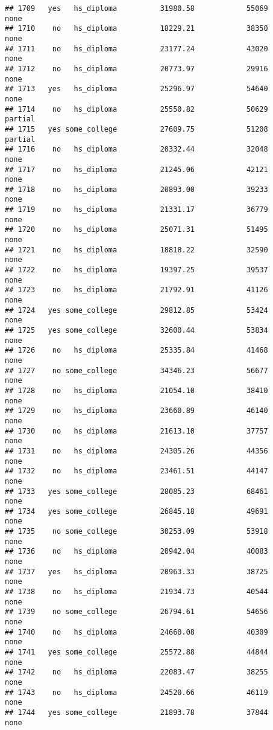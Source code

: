 \documentclass[
]{article}
\begin{document}
\begin{verbatim}
## 1709   yes   hs_diploma          31980.58            55069        none
## 1710    no   hs_diploma          18229.21            38350        none
## 1711    no   hs_diploma          23177.24            43020        none
## 1712    no   hs_diploma          20773.97            29916        none
## 1713   yes   hs_diploma          25296.97            54640        none
## 1714    no   hs_diploma          25550.82            50629     partial
## 1715   yes some_college          27609.75            51208     partial
## 1716    no   hs_diploma          20332.44            32048        none
## 1717    no   hs_diploma          21245.06            42121        none
## 1718    no   hs_diploma          20893.00            39233        none
## 1719    no   hs_diploma          21331.17            36779        none
## 1720    no   hs_diploma          25071.31            51495        none
## 1721    no   hs_diploma          18818.22            32590        none
## 1722    no   hs_diploma          19397.25            39537        none
## 1723    no   hs_diploma          21792.91            41126        none
## 1724   yes some_college          29812.85            53424        none
## 1725   yes some_college          32600.44            53834        none
## 1726    no   hs_diploma          25335.84            41468        none
## 1727    no some_college          34346.23            56677        none
## 1728    no   hs_diploma          21054.10            38410        none
## 1729    no   hs_diploma          23660.89            46140        none
## 1730    no   hs_diploma          21613.10            37757        none
## 1731    no   hs_diploma          24305.26            44356        none
## 1732    no   hs_diploma          23461.51            44147        none
## 1733   yes some_college          28085.23            68461        none
## 1734   yes some_college          26845.18            49691        none
## 1735    no some_college          30253.09            53918        none
## 1736    no   hs_diploma          20942.04            40083        none
## 1737   yes   hs_diploma          20963.33            38725        none
## 1738    no   hs_diploma          21934.73            40544        none
## 1739    no some_college          26794.61            54656        none
## 1740    no   hs_diploma          24660.08            40309        none
## 1741   yes some_college          25572.88            44844        none
## 1742    no   hs_diploma          22083.47            38255        none
## 1743    no   hs_diploma          24520.66            46119        none
## 1744   yes some_college          21893.78            37844        none

\end{verbatim}
\end{document}
